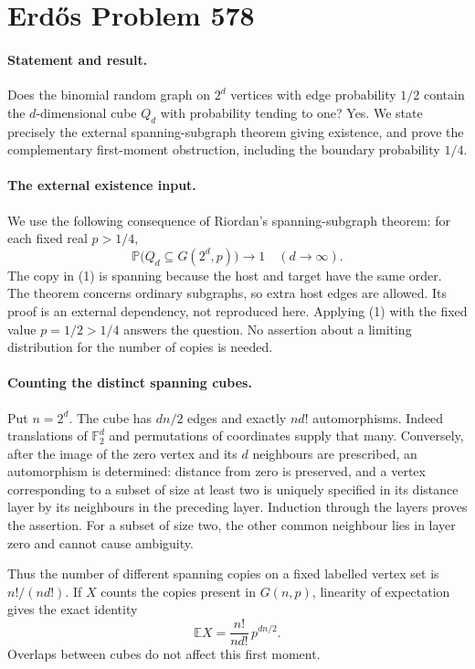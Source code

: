 \section*{Erd\H{o}s Problem 578}

\paragraph{Statement and result.}
Does the binomial random graph on \(2^d\) vertices with edge probability \(1/2\) contain the \(d\)-dimensional cube \(Q_d\) with probability tending to one? Yes. We state precisely the external spanning-subgraph theorem giving existence, and prove the complementary first-moment obstruction, including the boundary probability \(1/4\).

\paragraph{The external existence input.}
We use the following consequence of Riordan's spanning-subgraph theorem: for each fixed real \(p>1/4\),
\[
 \mathbb P\bigl(Q_d\subseteq G(2^d,p)\bigr)\longrightarrow1
 \quad(d\longrightarrow\infty). \tag{1}
\]
The copy in (1) is spanning because the host and target have the same order. The theorem concerns ordinary subgraphs, so extra host edges are allowed. Its proof is an external dependency, not reproduced here. Applying (1) with the fixed value \(p=1/2>1/4\) answers the question. No assertion about a limiting distribution for the number of copies is needed.

\paragraph{Counting the distinct spanning cubes.}
Put \(n=2^d\). The cube has \(dn/2\) edges and exactly \(n d!\) automorphisms. Indeed translations of \(\mathbb F_2^d\) and permutations of coordinates supply that many. Conversely, after the image of the zero vertex and its \(d\) neighbours are prescribed, an automorphism is determined: distance from zero is preserved, and a vertex corresponding to a subset of size at least two is uniquely specified in its distance layer by its neighbours in the preceding layer. Induction through the layers proves the assertion. For a subset of size two, the other common neighbour lies in layer zero and cannot cause ambiguity.

Thus the number of different spanning copies on a fixed labelled vertex set is \(n!/(n d!)\). If \(X\) counts the copies present in \(G(n,p)\), linearity of expectation gives the exact identity
\[
 \mathbb E X=\frac{n!}{n d!}\,p^{dn/2}. \tag{2}
\]
Overlaps between cubes do not affect this first moment.

